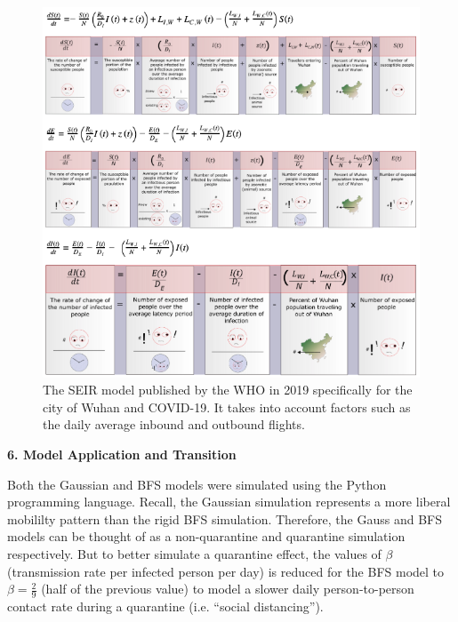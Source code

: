 \documentclass[a4paper]{article}
\begin{document}
\clearpage
\begin{figure}[ht]
  \includegraphics[scale=0.52]{./wuhan_seir.png}
  \centering
  \caption{The SEIR model published by the WHO in 2019 specifically for the city
  of Wuhan and COVID-19. It takes into account factors such as the daily average 
  inbound and outbound flights.}
\end{figure}

\begin{center}
  \textbf{6. Model Application and Transition}
\end{center}

Both the Gaussian and BFS models were simulated using the Python programming
language.
Recall, the Gaussian simulation represents a more liberal mobililty pattern 
than the rigid BFS simulation.
Therefore, the Gauss and BFS models can be thought of as a non-quarantine and quarantine
simulation respectively. But to better simulate a quarantine effect, the values
of $\beta$ (transmission rate per infected person per day) is reduced for the BFS
model to $\beta = \frac{2}{9}$ (half of the previous value) to model a slower daily 
person-to-person contact rate during a quarantine (i.e. ``social distancing'').
\end{document}

